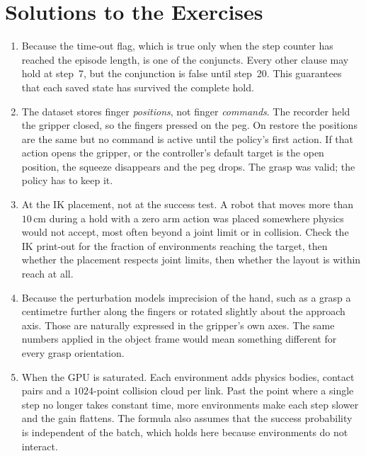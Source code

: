\documentclass{article}
\begin{document}
\section{Solutions to the Exercises}
\label{app:solutions}
\begin{enumerate}[leftmargin=*, itemsep=3pt, label=\textbf{E\arabic*.}]
  \item Because the time-out flag, which is true only when the step counter has reached the episode length, is one of the conjuncts. Every other clause may hold at step~7, but the conjunction is false until step~20. This guarantees that each saved state has survived the complete hold.
  \item The dataset stores finger \emph{positions}, not finger \emph{commands}. The recorder held the gripper closed, so the fingers pressed on the peg. On restore the positions are the same but no command is active until the policy's first action. If that action opens the gripper, or the controller's default target is the open position, the squeeze disappears and the peg drops. The grasp was valid; the policy has to keep it.
  \item At the IK placement, not at the success test. A robot that moves more than $10$\,cm during a hold with a zero arm action was placed somewhere physics would not accept, most often beyond a joint limit or in collision. Check the IK print-out for the fraction of environments reaching the target, then whether the placement respects joint limits, then whether the layout is within reach at all.
  \item Because the perturbation models imprecision of the hand, such as a grasp a centimetre further along the fingers or rotated slightly about the approach axis. Those are naturally expressed in the gripper's own axes. The same numbers applied in the object frame would mean something different for every grasp orientation.
  \item When the GPU is saturated. Each environment adds physics bodies, contact pairs and a $1024$-point collision cloud per link. Past the point where a single step no longer takes constant time, more environments make each step slower and the gain flattens. The formula also assumes that the success probability is independent of the batch, which holds here because environments do not interact.
\end{enumerate}
\end{document}
